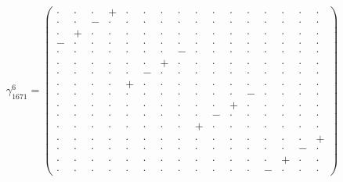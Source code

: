 \documentclass[
  10pt,
]{article}
\begin{document}
\[\gamma_{1671}^6=\left(\begin{smallmatrix} \cdot & \cdot & \cdot & + & \cdot & \cdot & \cdot & \cdot & \cdot & \cdot & \cdot & \cdot & \cdot & \cdot & \cdot & \cdot \\ \cdot & \cdot & - & \cdot & \cdot & \cdot & \cdot & \cdot & \cdot & \cdot & \cdot & \cdot & \cdot & \cdot & \cdot & \cdot \\ \cdot & + & \cdot & \cdot & \cdot & \cdot & \cdot & \cdot & \cdot & \cdot & \cdot & \cdot & \cdot & \cdot & \cdot & \cdot \\ - & \cdot & \cdot & \cdot & \cdot & \cdot & \cdot & \cdot & \cdot & \cdot & \cdot & \cdot & \cdot & \cdot & \cdot & \cdot \\ \cdot & \cdot & \cdot & \cdot & \cdot & \cdot & \cdot & - & \cdot & \cdot & \cdot & \cdot & \cdot & \cdot & \cdot & \cdot \\ \cdot & \cdot & \cdot & \cdot & \cdot & \cdot & + & \cdot & \cdot & \cdot & \cdot & \cdot & \cdot & \cdot & \cdot & \cdot \\ \cdot & \cdot & \cdot & \cdot & \cdot & - & \cdot & \cdot & \cdot & \cdot & \cdot & \cdot & \cdot & \cdot & \cdot & \cdot \\ \cdot & \cdot & \cdot & \cdot & + & \cdot & \cdot & \cdot & \cdot & \cdot & \cdot & \cdot & \cdot & \cdot & \cdot & \cdot \\ \cdot & \cdot & \cdot & \cdot & \cdot & \cdot & \cdot & \cdot & \cdot & \cdot & \cdot & - & \cdot & \cdot & \cdot & \cdot \\ \cdot & \cdot & \cdot & \cdot & \cdot & \cdot & \cdot & \cdot & \cdot & \cdot & + & \cdot & \cdot & \cdot & \cdot & \cdot \\ \cdot & \cdot & \cdot & \cdot & \cdot & \cdot & \cdot & \cdot & \cdot & - & \cdot & \cdot & \cdot & \cdot & \cdot & \cdot \\ \cdot & \cdot & \cdot & \cdot & \cdot & \cdot & \cdot & \cdot & + & \cdot & \cdot & \cdot & \cdot & \cdot & \cdot & \cdot \\ \cdot & \cdot & \cdot & \cdot & \cdot & \cdot & \cdot & \cdot & \cdot & \cdot & \cdot & \cdot & \cdot & \cdot & \cdot & + \\ \cdot & \cdot & \cdot & \cdot & \cdot & \cdot & \cdot & \cdot & \cdot & \cdot & \cdot & \cdot & \cdot & \cdot & - & \cdot \\ \cdot & \cdot & \cdot & \cdot & \cdot & \cdot & \cdot & \cdot & \cdot & \cdot & \cdot & \cdot & \cdot & + & \cdot & \cdot \\ \cdot & \cdot & \cdot & \cdot & \cdot & \cdot & \cdot & \cdot & \cdot & \cdot & \cdot & \cdot & - & \cdot & \cdot & \cdot \end{smallmatrix}\right)\qquad
\]
\end{document}
